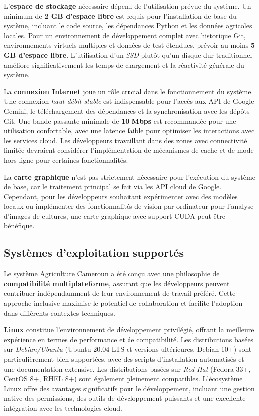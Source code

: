 L'\textbf{espace de stockage} nécessaire dépend de l'utilisation prévue du système. Un minimum de \textbf{2 GB d'espace libre} est requis pour l'installation de base du système, incluant le code source, les dépendances Python et les données agricoles locales. Pour un environnement de développement complet avec historique Git, environnements virtuels multiples et données de test étendues, prévoir au moins \textbf{5 GB d'espace libre}. L'utilisation d'un \emph{SSD} plutôt qu'un disque dur traditionnel améliore significativement les temps de chargement et la réactivité générale du système.

La \textbf{connexion Internet} joue un rôle crucial dans le fonctionnement du système. Une connexion \emph{haut débit stable} est indispensable pour l'accès aux API de Google Gemini, le téléchargement des dépendances et la synchronisation avec les dépôts Git. Une bande passante minimale de \textbf{10 Mbps} est recommandée pour une utilisation confortable, avec une latence faible pour optimiser les interactions avec les services cloud. Les développeurs travaillant dans des zones avec connectivité limitée devraient considérer l'implémentation de mécanismes de cache et de mode hors ligne pour certaines fonctionnalités.

La \textbf{carte graphique} n'est pas strictement nécessaire pour l'exécution du système de base, car le traitement principal se fait via les API cloud de Google. Cependant, pour les développeurs souhaitant expérimenter avec des modèles locaux ou implémenter des fonctionnalités de vision par ordinateur pour l'analyse d'images de cultures, une carte graphique avec support CUDA peut être bénéfique.

\subsection{Systèmes d'exploitation supportés}

Le système Agriculture Cameroun a été conçu avec une philosophie de \textbf{compatibilité multiplateforme}, assurant que les développeurs peuvent contribuer indépendamment de leur environnement de travail préféré. Cette approche inclusive maximise le potentiel de collaboration et facilite l'adoption dans différents contextes techniques.

\textbf{Linux} constitue l'environnement de développement privilégié, offrant la meilleure expérience en termes de performance et de compatibilité. Les distributions basées sur \emph{Debian/Ubuntu} (Ubuntu 20.04 LTS et versions ultérieures, Debian 10+) sont particulièrement bien supportées, avec des scripts d'installation automatisés et une documentation extensive. Les distributions basées sur \emph{Red Hat} (Fedora 33+, CentOS 8+, RHEL 8+) sont également pleinement compatibles. L'écosystème Linux offre des avantages significatifs pour le développement, incluant une gestion native des permissions, des outils de développement puissants et une excellente intégration avec les technologies cloud.

